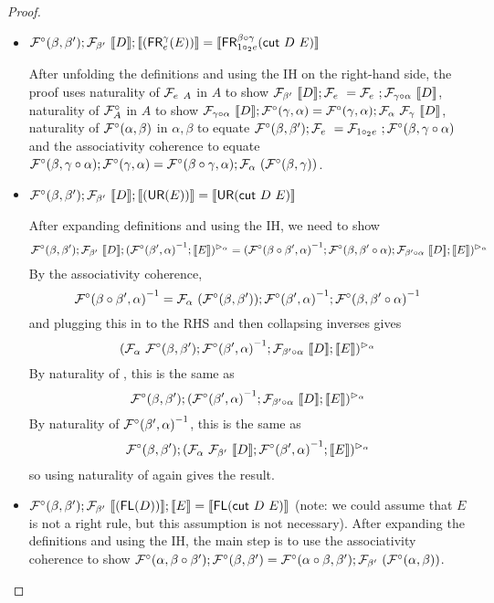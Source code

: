 \documentclass{drl-common/llncs}
\renewcommand{\sem}[1]{\ensuremath{ \llbracket #1 \rrbracket}}
\newcommand{\inv}[1]{\ensuremath{{#1}^{-1}}}
\newcommand\compo[2]{\ensuremath{#1 \circ #2}}
\newcommand\comph[2]{\ensuremath{#1 \mathbin{\circ_2} #2}}
\newcommand\cutsym{\ensuremath{\dsd{cut}}}
\newcommand\cut[2]{\ensuremath{{\cutsym \,\, #1 \,\, #2}}}
\newcommand\FR[3]{\ensuremath{\dsd{FR}^{#1}_{#2}(#3)}}
\newcommand\FL[1]{\ensuremath{\dsd{FL}(#1)}}
\newcommand\UR[1]{\ensuremath{\dsd{UR}(#1)}}
\begin{document}
\begin{proof}
\begin{itemize}
\item $\semofcut D {(\FR \gamma e E)} = \sem{\FR {\compo{\beta}{\gamma}} {\comph{1}{e}} {\cut D E}}$

After unfolding the definitions and using the
IH on the right-hand side, 
the proof uses naturality of $\mathcal{F}_{e} \,\, _A$ in $A$ to show
$\semF{\beta'}{\sem D}; \semF{e} =
\semF{e};\semF{\compo{\gamma}{\alpha}}{\sem D}$, 
naturality of $\mathcal{F}^\circ_A$ in $A$ to show
$\semF{\compo{\gamma}{\alpha}}{\sem D};\semFcomp(\gamma,\alpha) = 
\semFcomp(\gamma,\alpha);\semF{\alpha}{\semF{\gamma}{\sem D}}$,
naturality of $\mathcal{F}^\circ(\alpha,\beta)$ in $\alpha,\beta$ to equate
$\semFcomp(\beta,\beta');\semF{e} =
\semF{\comph{1}{e}};\semFcomp(\beta,\compo{\gamma}{\alpha})$
and the associativity coherence to equate 
$\semFcomp(\beta,\compo{\gamma}{\alpha});\semFcomp(\gamma,\alpha)
= \semFcomp(\compo{\beta}{\gamma},\alpha);\semF{\alpha}(\semFcomp(\beta,\gamma))$.

\item $\semofcut D {(\UR E)} = \sem{\UR {\cut D E}}$

After expanding definitions and using the IH, we need to show
\[
\semFcomp(\beta,\beta');\semF{\beta'}{\sem{D}};\semltor{(\inv{\semFcomp(\beta',\alpha)};\sem{E})}{\alpha}
=
\semltor{(\inv{\semFcomp(\compo{\beta}{\beta'},\alpha)};\semFcomp(\beta,\compo{\beta'}{\alpha});\semF{\compo{\beta'}{\alpha}}{\sem D};\sem{E})}{\alpha}
\]
By the associativity coherence, 
\[
\inv{\semFcomp(\compo{\beta}{\beta'},\alpha)} = 
\semF{\alpha}{(\semFcomp(\beta,\beta'))};\inv{\semFcomp(\beta',\alpha)};\inv{\semFcomp(\beta,\compo{\beta'}{\alpha})}
\]
and plugging this in to the RHS and then collapsing inverses gives 
\[
\semltor{(\semF{\alpha}{\semFcomp(\beta,\beta')};\inv{\semFcomp(\beta',\alpha)};\semF{\compo{\beta'}{\alpha}}{\sem D};\sem{E})}{\alpha}
\]
By naturality of \semltor{}{\alpha}, this is the same as
\[
{\semFcomp(\beta,\beta')};\semltor{(\inv{\semFcomp(\beta',\alpha)};\semF{\compo{\beta'}{\alpha}}{\sem D};\sem{E})}{\alpha}
\]
By naturality of \inv{\semFcomp(\beta',\alpha)}, this is the same as 
\[
{\semFcomp(\beta,\beta')};\semltor{(\semF{\alpha}{\semF{\beta'}{\sem D}};\inv{\semFcomp(\beta',\alpha)};\sem{E})}{\alpha}
\]
so using naturality of \semltor{}{\alpha} again gives the result.  

\item $\semofcut {(\FL D)} E = \sem{\FL {\cut D E}}$ (note: we could
  assume that $E$ is not a right rule, but this assumption is not
  necessary).  After expanding the definitions and using the IH, the
  main step is to use the associativity coherence to show
  $\semFcomp(\alpha,\compo{\beta}{\beta'});\semFcomp(\beta,\beta') =
  \semFcomp(\compo{\alpha}{\beta},\beta');\semF{\beta'}(\semFcomp(\alpha,\beta))$.


\end{itemize}
\end{proof}
\end{document}

